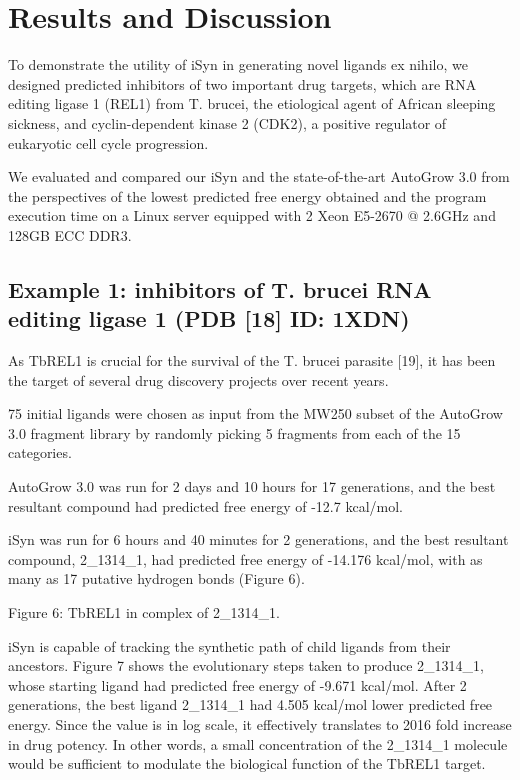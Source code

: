 \section{Results and Discussion}

To demonstrate the utility of iSyn in generating novel ligands ex nihilo, we designed predicted inhibitors of two important drug targets, which are RNA editing ligase 1 (REL1) from T. brucei, the etiological agent of African sleeping sickness, and cyclin-dependent kinase 2 (CDK2), a positive regulator of eukaryotic cell cycle progression.

We evaluated and compared our iSyn and the state-of-the-art AutoGrow 3.0 from the perspectives of the lowest predicted free energy obtained and the program execution time on a Linux server equipped with 2 Xeon E5-2670 @ 2.6GHz and 128GB ECC DDR3.

\subsection{Example 1: inhibitors of T. brucei RNA editing ligase 1 (PDB [18] ID: 1XDN)}

As TbREL1 is crucial for the survival of the T. brucei parasite [19], it has been the target of several drug discovery projects over recent years.

75 initial ligands were chosen as input from the MW250 subset of the AutoGrow 3.0 fragment library by randomly picking 5 fragments from each of the 15 categories.

AutoGrow 3.0 was run for 2 days and 10 hours for 17 generations, and the best resultant compound had predicted free energy of -12.7 kcal/mol.

iSyn was run for 6 hours and 40 minutes for 2 generations, and the best resultant compound, 2_1314_1, had predicted free energy of -14.176 kcal/mol, with as many as 17 putative hydrogen bonds (Figure 6).

 
Figure 6: TbREL1 in complex of 2_1314_1.

iSyn is capable of tracking the synthetic path of child ligands from their ancestors. Figure 7 shows the evolutionary steps taken to produce 2_1314_1, whose starting ligand had predicted free energy of -9.671 kcal/mol. After 2 generations, the best ligand 2_1314_1 had 4.505 kcal/mol lower predicted free energy. Since the value is in log scale, it effectively translates to 2016 fold increase in drug potency. In other words, a small concentration of the 2_1314_1 molecule would be sufficient to modulate the biological function of the TbREL1 target.

